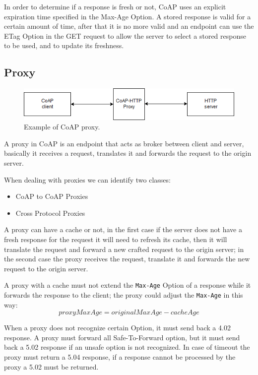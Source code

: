 	In order to determine if a response is fresh or not, CoAP uses an explicit expiration time specified in the Max-Age Option.\newline
	A stored response is valid for a certain amount of time, after that it is no more valid and an endpoint can use the ETag Option in the GET request to allow the server to select a stored response to be used, and to update its freshness.\newline
	
	\subsection{Proxy}
	
	\begin{figure}
		\includegraphics[width=\linewidth]{coap-img1.png}
		\caption{Example of CoAP proxy.}
		\label{fig:coap1}
	\end{figure}

	A proxy in CoAP is an endpoint that acts as broker between client and server, basically it receives a request, translates it and forwards the request to the origin server.
	
	When dealing with proxies we can identify two classes:
	\begin{itemize}
		\item CoAP to CoAP Proxies
		\item Cross Protocol Proxies
	\end{itemize}
	
	A proxy can have a cache or not, in the first case if the server does not have a fresh response for the request it will need to refresh its cache, then it will translate the request and forward a new crafted request to the origin server; in the second case the proxy receives the request, translate it and forwards the new request to the origin server.
	
	A proxy with a cache must not extend the \texttt{Max-Age} Option of a response while it forwards the response to the client; the proxy could adjust the \texttt{Max-Age} in this way:
	\begin{equation}
		proxyMaxAge=originalMaxAge-cacheAge
	\end{equation}
	
	When a proxy does not recognize certain Option, it must send back a 4.02 response.\newline
	A proxy must forward all Safe-To-Forward option, but it must send back a 5.02 response if an unsafe option is not recognized.\newline
	In case of timeout the proxy must return a 5.04 response, if a response cannot be processed by the proxy a 5.02 must be returned.\newline
	
